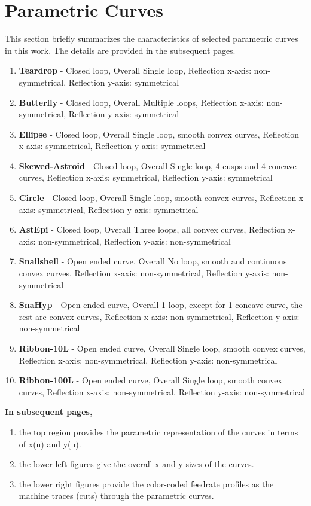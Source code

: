 
	
\section{Parametric Curves}

This section briefly summarizes the characteristics of selected parametric curves in this work. The details are provided in the subsequent pages.

\begin{enumerate}
	\item \textbf{Teardrop} - Closed loop, Overall Single loop, Reflection x-axis: non-symmetrical, Reflection y-axis: symmetrical
	\item \textbf{Butterfly} - Closed loop, Overall Multiple loops, Reflection x-axis: non-symmetrical, Reflection y-axis: symmetrical
	\item \textbf{Ellipse} - Closed loop, Overall Single loop, smooth convex curves, Reflection x-axis: symmetrical, Reflection y-axis: symmetrical
	\item \textbf{Skewed-Astroid} - Closed loop, Overall Single loop, 4 cusps and 4 concave curves,	Reflection x-axis: symmetrical, Reflection y-axis: symmetrical
	\item \textbf{Circle} - Closed loop, Overall Single loop, smooth convex curves, Reflection x-axis: symmetrical, Reflection y-axis: symmetrical
	\item \textbf{AstEpi} - Closed loop, Overall Three loops, all convex curves, Reflection x-axis: non-symmetrical, Reflection y-axis: non-symmetrical
	\item \textbf{Snailshell} - Open ended curve, Overall No loop, smooth and continuous convex curves, Reflection x-axis: non-symmetrical, Reflection y-axis: non-symmetrical
	\item \textbf{SnaHyp} - Open ended curve, Overall 1 loop, except for 1 concave curve, the rest are convex curves, Reflection x-axis: non-symmetrical, Reflection y-axis: non-symmetrical
	\item \textbf{Ribbon-10L} - Open ended curve, Overall Single loop, smooth convex curves, Reflection x-axis: non-symmetrical,
	Reflection y-axis: non-symmetrical
	\item \textbf{Ribbon-100L} - Open ended curve, Overall Single loop, smooth convex curves, Reflection x-axis: non-symmetrical, Reflection y-axis: non-symmetrical
\end{enumerate}

\textbf{In subsequent pages,} 
\begin{enumerate}
\item the top region provides the parametric representation of the curves in terms of x(u) and y(u).  
\item the lower left figures give the overall x and y sizes of the curves. 
\item the lower right figures provide the color-coded feedrate profiles as the machine traces (cuts) through the parametric curves.
\end{enumerate}
